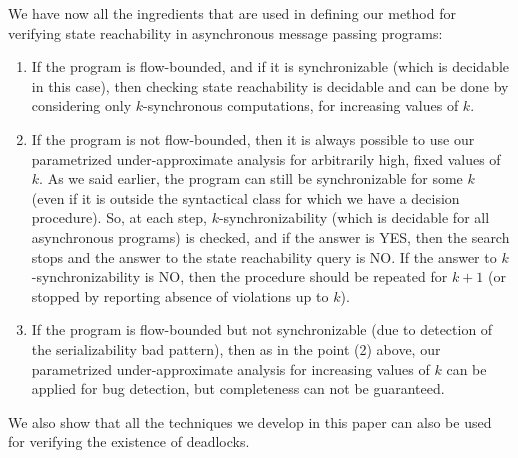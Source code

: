 We have now all the ingredients that are used in defining our method for verifying state reachability in asynchronous message passing programs: 
\begin{enumerate}
\item
If the program is flow-bounded, and if it is synchronizable (which is decidable in this case), then checking state reachability is decidable and can be done by considering only $k$-synchronous computations, for increasing values of $k$. 
\item 
If the program is not flow-bounded, then it is always possible to use our parametrized under-approximate analysis for arbitrarily high, fixed values of $k$. As we said earlier, the program can still be synchronizable for some $k$ (even if it is outside the syntactical class for which we have a decision procedure). So, at each step, $k$-synchronizability (which is decidable for all asynchronous programs) is checked, and if the answer is YES, then the search stops and the answer to the state reachability query is NO. If the answer to $k$-synchronizability is NO, then the procedure should be repeated for $k+1$ (or stopped by reporting absence of violations up to $k$). 
\item 
If the program is flow-bounded but not synchronizable (due to detection of the serializability bad pattern), then as in the point (2) above, our parametrized under-approximate analysis for increasing values of $k$ can be applied for bug detection, but completeness can not be guaranteed. 
\end{enumerate}

We also show that all the techniques we develop in this paper can also be used for verifying the existence of deadlocks.

